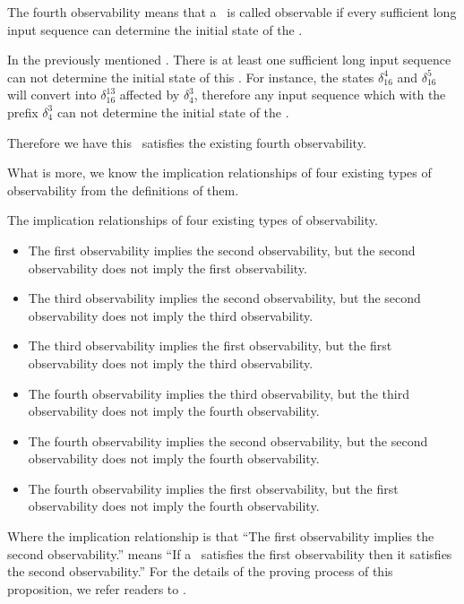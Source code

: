 The fourth observability means that a \BCN\ is called observable if every sufficient long input sequence can determine the initial state of the \BCN.
\begin{example}
In the previously mentioned \BCN. There is at least one sufficient long input sequence can not determine the initial state of this \BCN. For instance, the states $\delta_{16}^4$ and $\delta_{16}^5$  will convert into $\delta_{16}^{13}$ affected by $\delta_{4}^3$, therefore any input sequence which with the prefix $\delta_{4}^3$ can not determine the initial state of the \BCN.

Therefore we have this \BCN\ satisfies the existing fourth observability.
\end{example}  

What is more, we know the implication relationships of four existing types of observability from the definitions of them. 
\begin{proposition}
The implication relationships of four existing types of observability.
\begin{itemize}
\item The first observability implies the second observability, but the second observability does not imply the first observability.\\
\item The third observability implies the second observability, but the second observability does not imply the third observability.\\
\item The third observability implies the first observability, but the first observability does not imply the third observability.\\
\item The fourth observability implies the third observability, but the third observability does not imply the fourth observability.\\
\item The fourth observability implies the second observability, but the second observability does not imply the fourth observability.\\
\item The fourth observability implies the first observability, but the first observability does not imply the fourth observability. \\
\end{itemize} 
\end{proposition}

Where the implication relationship is that ``The first observability implies the second observability.'' means ``If a \BCN\ satisfies the first observability then it satisfies the second observability.'' For the details of the proving process of this proposition, we refer readers to \cite{Zhang2016Observability}.
 

